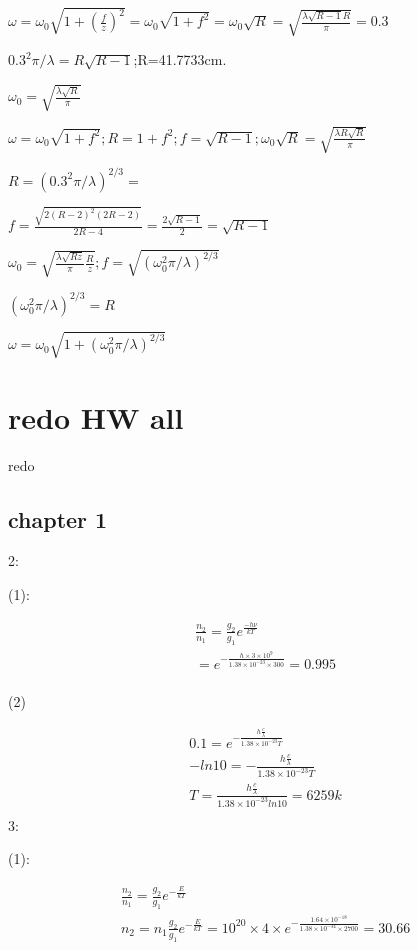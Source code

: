 \documentclass{article}
\begin{document}
$\omega=\omega_0\sqrt{1+(\frac fz)^2}=\omega_0\sqrt{1+f^2}=\omega_0\sqrt{R}=\sqrt{\frac{\lambda\sqrt{R-1}R}{\pi}}=0.3$

$0.3^2\pi/\lambda=R\sqrt{R-1}$;R=41.7733cm.

$\omega_0=\sqrt{\frac{\lambda \sqrt R}\pi}$

$\omega=\omega_0\sqrt{1+f^2};R=1+f^2;f=\sqrt{R-1};\omega_0\sqrt{R}=\sqrt{\frac{\lambda R\sqrt R}\pi} $

$  R=(0.3^2\pi/\lambda)^{2/3}=$

$f=\frac{\sqrt{2(R-2)^2(2R-2)}}{2R-4}=\frac{2\sqrt{R-1}}{2}=\sqrt{R-1}$

$\omega_0=\sqrt{\frac{\lambda \sqrt{Rz}}{\pi}\frac Rz};f=\sqrt{(\omega_0^2\pi/\lambda)^{2/3}}$

$(\omega_0^2\pi/\lambda)^{2/3}=R$

$\omega=\omega_0\sqrt{1+(\omega_0^2\pi/\lambda)^{2/3}}$
\newpage
\section{redo HW all}
redo

\subsection{chapter 1}

2:

(1):

\begin{align*}
  &\frac{n_2}{n_1}=\frac{g_2}{g_1}e^{\frac{-h\nu}{kT}}\\
  &=e^{-\frac{h\times3\times10^{9}}{1.38\times10^{-23}\times300}}=0.995\\
\end{align*}

(2)

\begin{align*}
  &0.1=e^{-\frac{h\frac c{\lambda}}{1.38\times10^{-23}T}}\\
  &-ln10=-\frac{h\frac c{\lambda}}{1.38\times10^{-23}T}\\
  &T=\frac{h\frac c{\lambda}}{1.38\times10^{-23}ln10}=6259 k\\
\end{align*}
3:

(1):

\begin{align*}
&\frac{n_2}{n_1}=\frac{g_2}{g_1}e^{-\frac{E}{kT}}\\
&n_2=n_1\frac{g_2}{g_1}e^{-\frac{E}{kT}}=10^{20}\times4\times e^{-\frac{1.64\times10^{-18}}{1.38\times10^{-34}\times2700}}=30.66\\
\end{align*}
\end{document}
